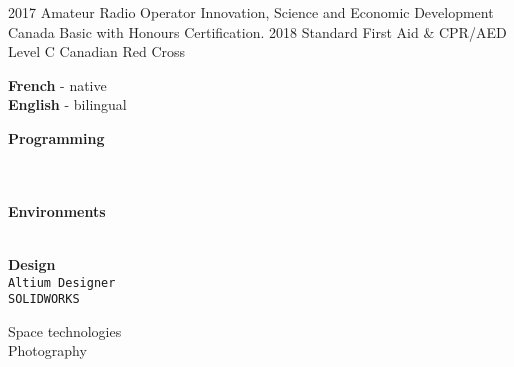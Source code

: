\documentclass[9pt]{developercv} %
\begin{document}
\begin{minipage}[t]{0.8\textwidth}


\begin{entrylist}
	\entry
		{2017}
		{Amateur Radio Operator}
		{Innovation, Science and Economic Development Canada}
		{
			Basic with Honours Certification.
		}
	\entry
		{2018}
		{Standard First Aid \& CPR/AED Level C}
		{Canadian Red Cross}
		{\vspace{-14pt}}
\end{entrylist}
\end{minipage}
\begin{minipage}[t]{0.02\textwidth}
	\hfill
\end{minipage}
\begin{minipage}[t]{0.18\textwidth}
		\textbf{French} - native\\
		\textbf{English} - bilingual

		\textbf{Programming}
		\begin{barchart}{1.75}
		\end{barchart}
		\\\\
		\textbf{Environments}
		\begin{barchart}{1.75}
		\end{barchart}
		\\
		\textbf{Design}\\
		\texttt{Altium Designer}\\
		\texttt{SOLIDWORKS}
	
		Space technologies\\
		Photography

\end{minipage}

\end{document}
